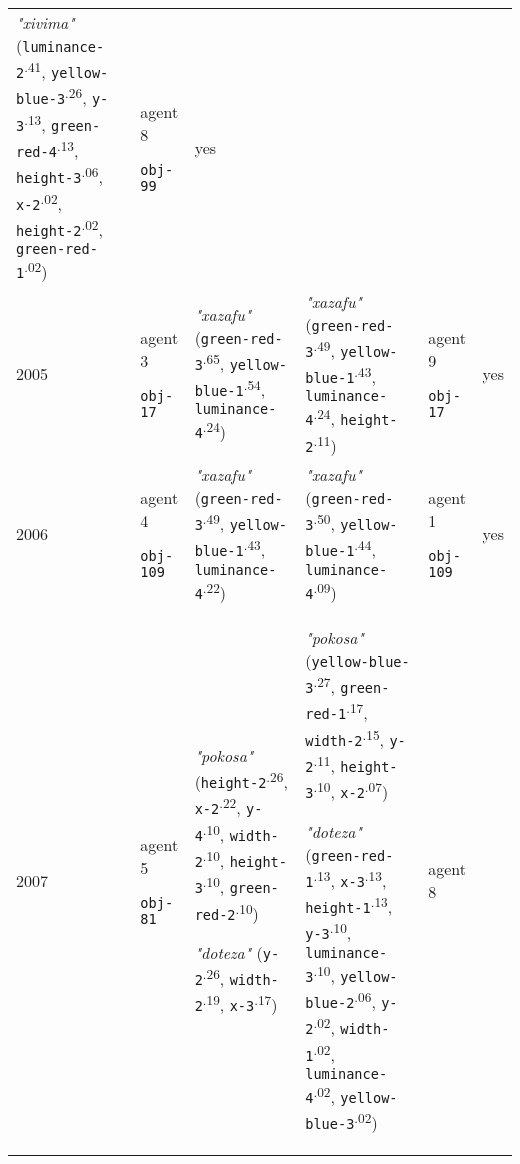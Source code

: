 {\begin{tabular}{p{0.4cm}p{1.4cm}p{7cm}p{7cm}p{1.4cm}p{0.6cm}}
\textit{"xivima"} (\texttt{luminance-2}\textsuperscript{.41}, \texttt{yellow-blue-3}\textsuperscript{.26}, \texttt{y-3}\textsuperscript{.13}, \texttt{green-red-4}\textsuperscript{.13}, \texttt{height-3}\textsuperscript{.06}, \texttt{x-2}\textsuperscript{.02}, \texttt{height-2}\textsuperscript{.02}, \texttt{green-red-1}\textsuperscript{.02}) & agent 8 

 \texttt{obj-99} & yes \\
2005 & agent 3 

\texttt{obj-17} &\textit{"xazafu"} (\texttt{green-red-3}\textsuperscript{.65}, \texttt{yellow-blue-1}\textsuperscript{.54}, \texttt{luminance-4}\textsuperscript{.24}) & \textit{"xazafu"} (\texttt{green-red-3}\textsuperscript{.49}, \texttt{yellow-blue-1}\textsuperscript{.43}, \texttt{luminance-4}\textsuperscript{.24}, \texttt{height-2}\textsuperscript{.11}) & agent 9 

 \texttt{obj-17} & yes \\
2006 & agent 4 

\texttt{obj-109} &\textit{"xazafu"} (\texttt{green-red-3}\textsuperscript{.49}, \texttt{yellow-blue-1}\textsuperscript{.43}, \texttt{luminance-4}\textsuperscript{.22}) & \textit{"xazafu"} (\texttt{green-red-3}\textsuperscript{.50}, \texttt{yellow-blue-1}\textsuperscript{.44}, \texttt{luminance-4}\textsuperscript{.09}) & agent 1 

 \texttt{obj-109} & yes \\
2007 & agent 5 

\texttt{obj-81} &\textit{"pokosa"} (\texttt{height-2}\textsuperscript{.26}, \texttt{x-2}\textsuperscript{.22}, \texttt{y-4}\textsuperscript{.10}, \texttt{width-2}\textsuperscript{.10}, \texttt{height-3}\textsuperscript{.10}, \texttt{green-red-2}\textsuperscript{.10})

\textit{"doteza"} (\texttt{y-2}\textsuperscript{.26}, \texttt{width-2}\textsuperscript{.19}, \texttt{x-3}\textsuperscript{.17}) & \textit{"pokosa"} (\texttt{yellow-blue-3}\textsuperscript{.27}, \texttt{green-red-1}\textsuperscript{.17}, \texttt{width-2}\textsuperscript{.15}, \texttt{y-2}\textsuperscript{.11}, \texttt{height-3}\textsuperscript{.10}, \texttt{x-2}\textsuperscript{.07})

\textit{"doteza"} (\texttt{green-red-1}\textsuperscript{.13}, \texttt{x-3}\textsuperscript{.13}, \texttt{height-1}\textsuperscript{.13}, \texttt{y-3}\textsuperscript{.10}, \texttt{luminance-3}\textsuperscript{.10}, \texttt{yellow-blue-2}\textsuperscript{.06}, \texttt{y-2}\textsuperscript{.02}, \texttt{width-1}\textsuperscript{.02}, \texttt{luminance-4}\textsuperscript{.02}, \texttt{yellow-blue-3}\textsuperscript{.02}) & agent 8 


\end{tabular}}
